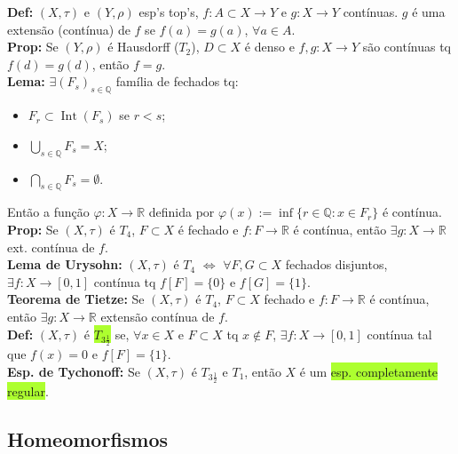 \documentclass{article}
\begin{document}
\begin{landscape}
\begin{multicols}{3}
\textbf{Def:} $(X, \tau)$ e $(Y, \rho)$ esp's top's, $f: A \subset X \to Y$ e $g: X \to Y$ contínuas. $g$ é uma extensão (contínua) de $f$ se $f(a) = g(a)$, $\forall a \in A$.\\
\textbf{Prop:} Se $(Y, \rho)$ é Hausdorff ($T_2$), $D \subset X$ é denso e $f, g: X \to Y$ são contínuas tq $f(d) = g(d)$, então $f = g$.\\
\textbf{Lema:} $\exists (F_s)_{s \in \mathbb{Q}}$ família de fechados tq:
\begin{itemize}
  \item $F_r \subset \operatorname{Int}(F_s)$ se $r < s$;
  \item $\bigcup_{s \in \mathbb{Q}} F_s = X$;
  \item $\bigcap_{s \in \mathbb{Q}} F_s = \emptyset$.
\end{itemize}
Então a função $\varphi: X \to \mathbb{R}$ definida por $\varphi(x) := \inf \{r \in \mathbb{Q} : x \in F_r\}$ é contínua.\\
\textbf{Prop:} Se $(X, \tau)$ é $T_4$, $F \subset X$ é fechado e $f: F \to \mathbb{R}$ é contínua, então $\exists g: X \to \mathbb{R}$ ext. contínua de $f$.\\
\textbf{Lema de Urysohn:} $(X, \tau)$ é $T_4$ $\Leftrightarrow$ $\forall F, G \subset X$ fechados disjuntos, $\exists f: X \to [0,1]$ contínua tq $f[F] = \{0\}$ e $f[G] = \{1\}$.\\
\textbf{Teorema de Tietze:} Se $(X, \tau)$ é $T_4$, $F \subset X$ fechado e $f: F \to \mathbb{R}$ é contínua, então $\exists g: X \to \mathbb{R}$ extensão contínua de $f$.\\
\textbf{Def:} $(X, \tau)$ é \colorbox{GreenYellow}{$T_{3\frac{1}{2}}$} se, $\forall x \in X$ e $F \subset X$ tq $x \notin F$, $\exists f: X \to [0,1]$ contínua tal que $f(x) = 0$ e $f[F] = \{1\}$.\\
\textbf{Esp. de Tychonoff:} Se $(X, \tau)$ é $T_{3\frac{1}{2}}$ e $T_1$, então $X$ é um \colorbox{GreenYellow}{esp. completamente regular}.
\end{multicols}
\begin{center}    
\section{Homeomorfismos}
\end{center}
\begin{multicols}{3}
    

\end{multicols}
\end{landscape}
\end{document}
